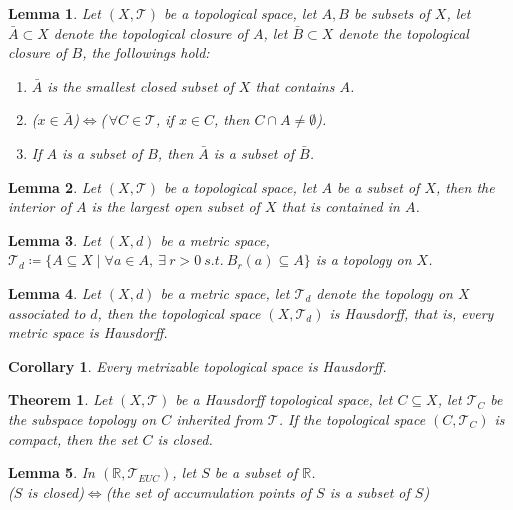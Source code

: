 \documentclass[11pt]{article}
\theoremstyle{break}
\theoremstyle{break}
\newtheorem{thm}{Theorem}[section]
\newtheorem{lem}{Lemma}[thm]
\newtheorem{corL}{Corollary}[lem]
\newcommand{\R}{\mathbb{R}}
\newcommand{\T}{\mathcal{T}}
\begin{document}
	\begin{lem}
		Let $(X,\T)$ be a topological space, let $A,B$ be subsets of $X$, let $\bar{A} \subset X$ denote the topological closure of $A$,  let $\bar{B} \subset X$ denote the topological closure of $B$, the followings hold:
		\begin{enumerate}[topsep=3pt,itemsep=-1ex,partopsep=1ex,parsep=1ex]
			\item $\bar{A}$ is the smallest closed subset of $X$ that contains $A$.
			\item ($x \in \bar{A}$)$\iff$(\,$\forall C \in \T$, if $x \in C$, then $C \cap A \neq \emptyset$).
			\item If $A$ is a subset of $B$, then $\bar{A}$ is a subset of $\bar{B}$.
		\end{enumerate}
	\end{lem}
	
	\begin{lem}
		Let $(X,\T)$ be a topological space, let $A$ be a subset of $X$, then the interior of $A$ is the largest open subset of $X$ that is contained in  $A$.
	\end{lem}
	
	\begin{lem}
		Let $(X,d)$ be a metric space, $\T_d \coloneqq \{ A \subseteq X \mid \forall a \in A, \ \exists \ r>0 \ s.t. \ B_r(a) \subseteq A\}$ is a topology on $X$.
	\end{lem}
	
	\begin{lem}
		Let $(X,d)$ be a metric space, let $\T_d$ denote the topology on $X$ associated to $d$, then the topological space $(X,\T_d)$ is Hausdorff, that is, every metric space is Hausdorff.
	\end{lem}
	
	\begin{corL}
		Every metrizable topological space is Hausdorff.
	\end{corL}
	
	\begin{thm} 
		Let $(X,\T)$ be a Hausdorff topological space, let $C \subseteq X$, let $\T_C$ be the subspace topology on $C$ inherited from $\T$. If the topological space $(C,\T_C)$ is compact, then the set $C$ is closed.
	\end{thm}
	
	\begin{lem}
		In $(\R, \T_{EUC})$, let $S$ be a subset of $\R$. \\($S$ is closed)$\iff$(the set of accumulation points of $S$ is a subset of $S$)
	\end{lem}
	
\end{document}
